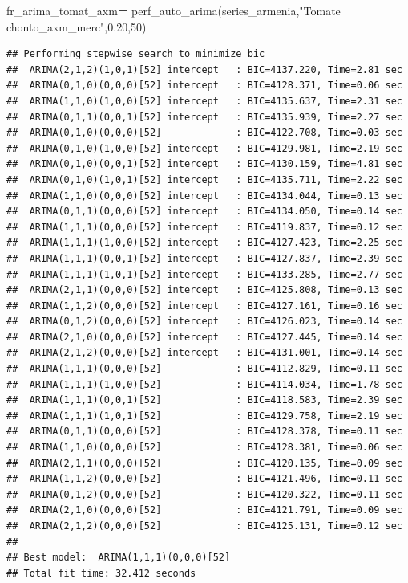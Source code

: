 \documentclass[
]{book}
\newenvironment{Shaded}{\begin{snugshade}}{\end{snugshade}}
\newcommand{\DecValTok}[1]{\textcolor[rgb]{0.00,0.00,0.81}{#1}}
\newcommand{\FloatTok}[1]{\textcolor[rgb]{0.00,0.00,0.81}{#1}}
\newcommand{\NormalTok}[1]{#1}
\newcommand{\OperatorTok}[1]{\textcolor[rgb]{0.81,0.36,0.00}{\textbf{#1}}}
\newcommand{\StringTok}[1]{\textcolor[rgb]{0.31,0.60,0.02}{#1}}
\begin{document}
\begin{Shaded}
\begin{Highlighting}[]

\NormalTok{fr\_arima\_tomat\_axm}\OperatorTok{=}\NormalTok{ perf\_auto\_arima(series\_armenia,}\StringTok{"Tomate chonto\_axm\_merc"}\NormalTok{,}\FloatTok{0.20}\NormalTok{,}\DecValTok{50}\NormalTok{)}
\end{Highlighting}
\end{Shaded}

\begin{verbatim}
## Performing stepwise search to minimize bic
##  ARIMA(2,1,2)(1,0,1)[52] intercept   : BIC=4137.220, Time=2.81 sec
##  ARIMA(0,1,0)(0,0,0)[52] intercept   : BIC=4128.371, Time=0.06 sec
##  ARIMA(1,1,0)(1,0,0)[52] intercept   : BIC=4135.637, Time=2.31 sec
##  ARIMA(0,1,1)(0,0,1)[52] intercept   : BIC=4135.939, Time=2.27 sec
##  ARIMA(0,1,0)(0,0,0)[52]             : BIC=4122.708, Time=0.03 sec
##  ARIMA(0,1,0)(1,0,0)[52] intercept   : BIC=4129.981, Time=2.19 sec
##  ARIMA(0,1,0)(0,0,1)[52] intercept   : BIC=4130.159, Time=4.81 sec
##  ARIMA(0,1,0)(1,0,1)[52] intercept   : BIC=4135.711, Time=2.22 sec
##  ARIMA(1,1,0)(0,0,0)[52] intercept   : BIC=4134.044, Time=0.13 sec
##  ARIMA(0,1,1)(0,0,0)[52] intercept   : BIC=4134.050, Time=0.14 sec
##  ARIMA(1,1,1)(0,0,0)[52] intercept   : BIC=4119.837, Time=0.12 sec
##  ARIMA(1,1,1)(1,0,0)[52] intercept   : BIC=4127.423, Time=2.25 sec
##  ARIMA(1,1,1)(0,0,1)[52] intercept   : BIC=4127.837, Time=2.39 sec
##  ARIMA(1,1,1)(1,0,1)[52] intercept   : BIC=4133.285, Time=2.77 sec
##  ARIMA(2,1,1)(0,0,0)[52] intercept   : BIC=4125.808, Time=0.13 sec
##  ARIMA(1,1,2)(0,0,0)[52] intercept   : BIC=4127.161, Time=0.16 sec
##  ARIMA(0,1,2)(0,0,0)[52] intercept   : BIC=4126.023, Time=0.14 sec
##  ARIMA(2,1,0)(0,0,0)[52] intercept   : BIC=4127.445, Time=0.14 sec
##  ARIMA(2,1,2)(0,0,0)[52] intercept   : BIC=4131.001, Time=0.14 sec
##  ARIMA(1,1,1)(0,0,0)[52]             : BIC=4112.829, Time=0.11 sec
##  ARIMA(1,1,1)(1,0,0)[52]             : BIC=4114.034, Time=1.78 sec
##  ARIMA(1,1,1)(0,0,1)[52]             : BIC=4118.583, Time=2.39 sec
##  ARIMA(1,1,1)(1,0,1)[52]             : BIC=4129.758, Time=2.19 sec
##  ARIMA(0,1,1)(0,0,0)[52]             : BIC=4128.378, Time=0.11 sec
##  ARIMA(1,1,0)(0,0,0)[52]             : BIC=4128.381, Time=0.06 sec
##  ARIMA(2,1,1)(0,0,0)[52]             : BIC=4120.135, Time=0.09 sec
##  ARIMA(1,1,2)(0,0,0)[52]             : BIC=4121.496, Time=0.11 sec
##  ARIMA(0,1,2)(0,0,0)[52]             : BIC=4120.322, Time=0.11 sec
##  ARIMA(2,1,0)(0,0,0)[52]             : BIC=4121.791, Time=0.09 sec
##  ARIMA(2,1,2)(0,0,0)[52]             : BIC=4125.131, Time=0.12 sec
## 
## Best model:  ARIMA(1,1,1)(0,0,0)[52]          
## Total fit time: 32.412 seconds
\end{verbatim}
\end{document}
